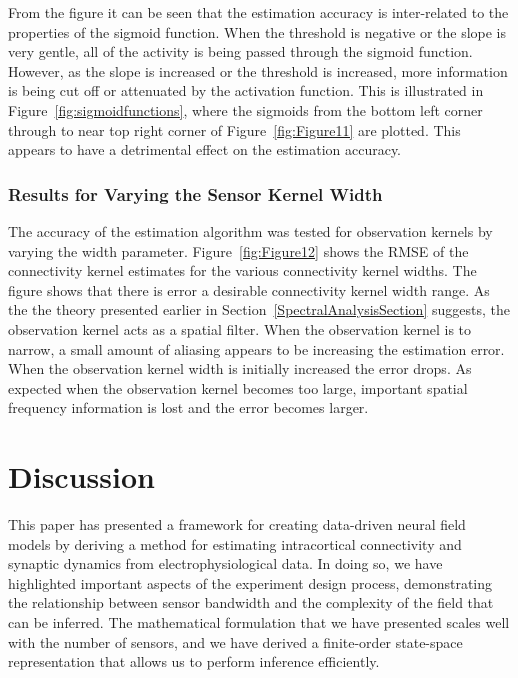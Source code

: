 \documentclass[12pt]{iopart}
\begin{document}
From the figure it can be seen that the estimation accuracy is inter-related to the properties of the sigmoid function. When the threshold is negative or the slope is very gentle, all of the activity is being passed through the sigmoid function. However, as the slope is increased or the threshold is increased, more information is being cut off or attenuated by the activation function. This is illustrated in Figure~\ref{fig:sigmoidfunctions}, where the sigmoids from the bottom left corner through to near top right corner of Figure~\ref{fig:Figure11} are plotted. This appears to have a detrimental effect on the estimation accuracy.

\subsubsection{Results for Varying the Sensor Kernel Width}
The accuracy of the estimation algorithm was tested for observation kernels by varying the width parameter. Figure~\ref{fig:Figure12} shows the RMSE of the connectivity kernel estimates for the various connectivity kernel widths. The figure shows that there is error a desirable connectivity kernel width range. As the the theory presented earlier in Section~\ref{SpectralAnalysisSection} suggests, the observation kernel acts as a spatial filter. When the observation kernel is to narrow, a small amount of aliasing appears to be increasing the estimation error. When the observation kernel width is initially increased the error drops. As expected when the observation kernel becomes too large, important spatial frequency information is lost and the error becomes larger.  

\section{Discussion}\label{DiscussionSection}
This paper has presented a framework for creating data-driven neural field models by deriving a method for estimating intracortical connectivity and synaptic dynamics from electrophysiological data. In doing so, we have highlighted important aspects of the experiment design process, demonstrating the relationship between sensor bandwidth and the complexity of the field that can be inferred. The mathematical formulation that we have presented scales well with the number of sensors, and we have derived a finite-order state-space representation that allows us to perform inference efficiently. 
\end{document}
